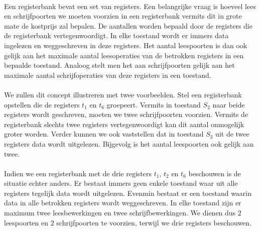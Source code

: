 \paragraph{}
Een registerbank bevat een set van registers. Een belangrijke vraag is hoeveel lees en schrijfpoorten we moeten voorzien in een registerbank vermits dit in grote mate de kostprijs zal bepalen. De aantallen worden bepaald door de registers die de registerbank vertegenwoordigt. In elke toestand wordt er immers data ingelezen en weggeschreven in deze registers. Het aantal leespoorten is dan ook gelijk aan het maximale aantal leesoperaties van de betrokken registers in een bepaalde toestand. Analoog stelt men het aan schrijfpoorten gelijk aan het maximale aantal schrijfoperaties van deze registers in een toestand.
\paragraph{}
We zullen dit concept illustreren met twee voorbeelden. Stel een registerbank opstellen die de registers $t_1$ en $t_6$ groepeert. Vermits in toestand $S_2$ naar beide registers wordt geschreven, moeten we twee schrijfpoorten voorzien. Vermits de registerbank slechts twee registers vertegenwoordigt kan dit aantal onmogelijk groter worden.  Verder kunnen we ook vaststellen dat in toestand $S_3$ uit de twee registers data wordt uitgelezen. Bijgevolg is het aantal leespoorten ook gelijk aan twee.
\paragraph{}
Indien we een registerbank met de drie registers $t_1$, $t_2$ en $t_6$ beschouwen is de situatie echter anders. Er bestaat immers geen enkele toestand waar uit alle registers tegelijk data wordt uitgelezen. Evenmin bestaat er een toestand waarin data in alle betrokken registers wordt weggeschreven. In elke toestand zijn er maximum twee leesbewerkingen en twee schrijfbewerkingen. We dienen dus $2$ leespoorten en $2$ schrijfpoorten te voorzien, terwijl we drie registers beschouwen.
